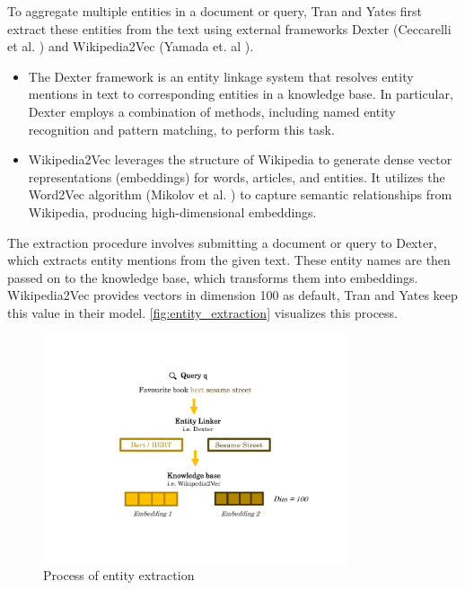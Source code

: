 To aggregate multiple entities in a document or query, Tran and Yates first extract these entities from the text using external frameworks Dexter (Ceccarelli et al. \cite{ceccarelli2013dexter}) and Wikipedia2Vec (Yamada et. al \cite{yamada2018wikipedia2vec}).
\begin{itemize}
    \item The Dexter framework is an entity linkage system that resolves entity mentions in text to corresponding entities in a knowledge base. In particular, Dexter employs a combination of methods, including named entity recognition and pattern matching, to perform this task. 
    \item Wikipedia2Vec leverages the structure of Wikipedia to generate dense vector representations (embeddings) for words, articles, and entities. It utilizes the Word2Vec algorithm (Mikolov et al. \cite{mikolov2013distributed}) to capture semantic relationships from Wikipedia, producing high-dimensional embeddings.
\end{itemize}

The extraction procedure involves submitting a document or query to Dexter, which extracts entity mentions from the given text. These entity names are then passed on to the knowledge base, which transforms them into embeddings. Wikipedia2Vec provides vectors in dimension 100 as default, Tran and Yates keep this value in their model. \autoref{fig:entity_extraction} visualizes this process.

\begin{figure}[!htb]
    \centering
    \includegraphics[trim={2cm 3cm 2cm 2cm}, clip, width=0.8\textwidth]{resources/entity_extraction} 
    \caption{Process of entity extraction}
    \label{fig:entity_extraction}
\end{figure}


